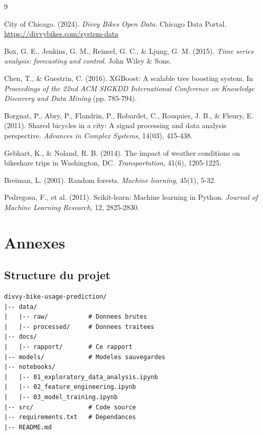 \documentclass[12pt,a4paper]{article}
\begin{document}
\newpage

\begin{thebibliography}{9}

City of Chicago. (2024). \textit{Divvy Bikes Open Data}. Chicago Data Portal. \url{https://divvybikes.com/system-data}

Box, G. E., Jenkins, G. M., Reinsel, G. C., \& Ljung, G. M. (2015). \textit{Time series analysis: forecasting and control}. John Wiley \& Sons.

Chen, T., \& Guestrin, C. (2016). XGBoost: A scalable tree boosting system. In \textit{Proceedings of the 22nd ACM SIGKDD International Conference on Knowledge Discovery and Data Mining} (pp. 785-794).

Borgnat, P., Abry, P., Flandrin, P., Robardet, C., Rouquier, J. B., \& Fleury, E. (2011). Shared bicycles in a city: A signal processing and data analysis perspective. \textit{Advances in Complex Systems}, 14(03), 415-438.

Gebhart, K., \& Noland, R. B. (2014). The impact of weather conditions on bikeshare trips in Washington, DC. \textit{Transportation}, 41(6), 1205-1225.

Breiman, L. (2001). Random forests. \textit{Machine learning}, 45(1), 5-32.

Pedregosa, F., et al. (2011). Scikit-learn: Machine learning in Python. \textit{Journal of Machine Learning Research}, 12, 2825-2830.

\end{thebibliography}

\newpage
\appendix
\section{Annexes}

\subsection{Structure du projet}

\begin{lstlisting}[caption=Arborescence du projet]
divvy-bike-usage-prediction/
|-- data/
|   |-- raw/           # Donnees brutes
|   |-- processed/     # Donnees traitees
|-- docs/
|   |-- rapport/       # Ce rapport
|-- models/            # Modeles sauvegardes
|-- notebooks/
|   |-- 01_exploratory_data_analysis.ipynb
|   |-- 02_feature_engineering.ipynb
|   |-- 03_model_training.ipynb
|-- src/               # Code source
|-- requirements.txt   # Dependances
|-- README.md
\end{lstlisting}
\end{document}
